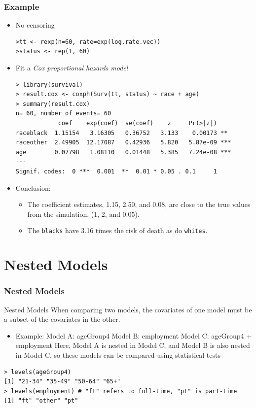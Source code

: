 \documentclass{beamer}
\newcommand{\empr}[1]{{\emph{\color{red}#1}}}
\begin{document}
\pagebreak
\begin{frame}[fragile]
\frametitle{Example}	
\begin{itemize}
\item No censoring
\begin{Verbatim}
>tt <- rexp(n=60, rate=exp(log.rate.vec)) 
>status <- rep(1, 60)
\end{Verbatim}
\item Fit a \empr{Cox proportional hazards model}
\begin{Verbatim}
> library(survival)
> result.cox <- coxph(Surv(tt, status) ~ race + age)
> summary(result.cox)
n= 60, number of events= 60
            coef    exp(coef)  se(coef)    z     Pr(>|z|)
raceblack  1.15154   3.16305   0.36752   3.133    0.00173 **
raceother  2.49905  12.17087   0.42936   5.820   5.87e-09 ***
age        0.07798   1.08110   0.01448   5.385   7.24e-08 ***
---
Signif. codes:  0 ***  0.001  **  0.01 * 0.05 . 0.1     1
\end{Verbatim}
\item Conclusion:
\begin{itemize} 
\item The coefficient estimates, 1.15, 2.50, and 0.08, are close to the true values from the simulation, (1, 2, and 0.05).
\item The  \texttt{blacks} have 3.16 times the risk of death as do \texttt{whites}.
\end{itemize}
\end{itemize}
\end{frame}

\section{Nested Models}
\begin{frame}[fragile]
\frametitle{Nested Models}
\begin{defblock}{Nested Models}
When comparing two models, the covariates of one model must be a {\color{red}subset} of the covariates in the other.
\end{defblock}
\begin{itemize}
\item Example:\linebreak 
Model A: ageGroup4\linebreak
Model B: employment\linebreak
Model C: ageGroup4 + employment\linebreak
Here, Model A is nested in Model C, and Model B is also nested in Model C, so these models can be compared using statistical tests
\end{itemize}
\begin{Verbatim}
> levels(ageGroup4)
[1] "21-34" "35-49" "50-64" "65+"
> levels(employment) # "ft" refers to full-time, "pt" is part-time
[1] "ft" "other" "pt"  
\end{Verbatim}
\end{frame}
\end{document}
